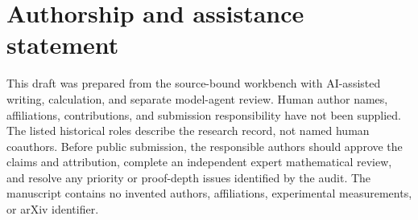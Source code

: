 \section*{Authorship and assistance statement}
This draft was prepared from the source-bound workbench with AI-assisted writing, calculation, and separate model-agent review. Human author names, affiliations, contributions, and submission responsibility have not been supplied. The listed historical roles describe the research record, not named human coauthors. Before public submission, the responsible authors should approve the claims and attribution, complete an independent expert mathematical review, and resolve any priority or proof-depth issues identified by the audit. The manuscript contains no invented authors, affiliations, experimental measurements, or arXiv identifier.
